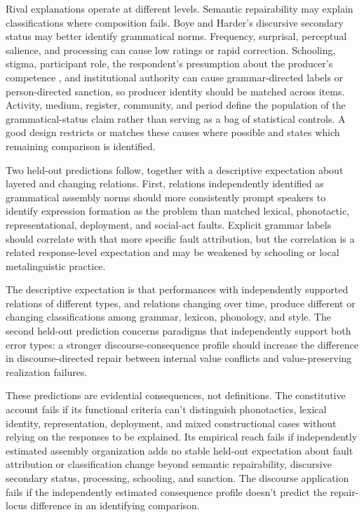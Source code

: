\documentclass[12pt,letterpaper]{article}
\begin{document}
Rival explanations operate at different levels. Semantic repairability may explain
classifications where composition fails. Boye and Harder's discursive secondary
status may better identify grammatical norms. Frequency, surprisal, perceptual
salience, and processing can cause low ratings or rapid correction. Schooling,
stigma, participant role, the respondent's presumption about the producer's
competence \citep[98--99]{coseriu2019}, and institutional authority can cause
grammar-directed labels or person-directed sanction, so producer identity should
be matched across items. Activity, medium, register, community, and
period define the population of the grammatical-status claim rather than serving
as a bag of statistical controls. A good design restricts or matches these causes where possible and states
which remaining comparison is identified.

Two held-out predictions follow, together with a descriptive expectation about
layered and changing relations. First, relations independently
identified as grammatical assembly norms should more consistently prompt speakers
to identify expression formation as the problem than
matched lexical, phonotactic, representational, deployment, and social-act faults.
Explicit grammar labels should correlate with that more specific fault
attribution, but the correlation is a related response-level expectation and may
be weakened by schooling or local metalinguistic practice.

The descriptive expectation is that performances with independently supported
relations of different types, and relations changing over time, produce different
or changing classifications among grammar, lexicon, phonology, and style. The
second held-out prediction concerns paradigms that independently support both
error types: a stronger
discourse-consequence profile should increase the difference in discourse-directed
repair between internal value conflicts and value-preserving realization failures.

These predictions are evidential consequences, not definitions. The constitutive
account fails if its functional criteria can't distinguish phonotactics, lexical identity,
representation, deployment, and mixed constructional cases without relying on the
responses to be explained. Its empirical reach fails if independently estimated
assembly organization adds no stable held-out expectation about fault attribution
or classification change beyond semantic repairability, discursive secondary status,
processing, schooling, and sanction. The discourse application fails if the
independently estimated consequence profile doesn't predict the repair-locus
difference in an identifying comparison.
\end{document}
